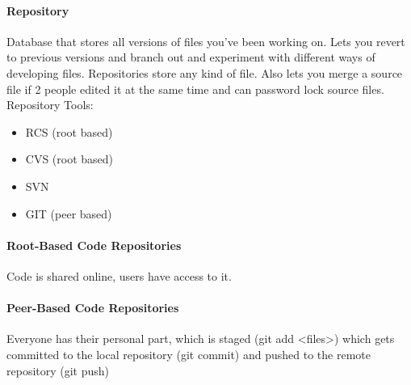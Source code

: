 \documentclass[12 pt]{article}
\begin{document}
\paragraph{Repository} Database that stores all versions of files you've been working on. Lets you revert to previous versions and branch out and experiment with different ways of developing files. Repositories store any kind of file. Also lets you merge a source file if 2 people edited it at the same time and can password lock source files.
\\ Repository Tools:
\begin{itemize}
\item RCS (root based)
\item CVS (root based)
\item SVN
\item GIT (peer based)
\end{itemize}
\paragraph{Root-Based Code Repositories} Code is shared online, users have access to it.
\paragraph{Peer-Based Code Repositories} Everyone has their personal part, which is staged (git add <files>) which gets committed to the local repository (git commit) and pushed to the remote repository (git push)
\end{document}
